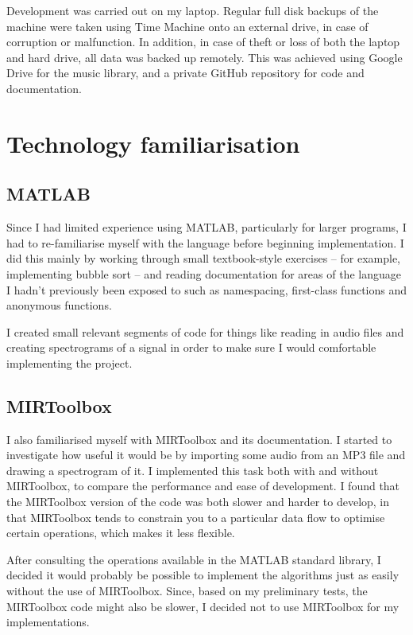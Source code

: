 \documentclass[12pt,a4paper,twoside,openright]{report}
\begin{document}
Development was carried out on my laptop. Regular full disk backups of the machine were taken using Time Machine onto an external drive, in case of corruption or malfunction. In addition, in case of theft or loss of both the laptop and hard drive, all data was backed up remotely. This was achieved using Google Drive for the music library, and a private GitHub repository for code and documentation.




\section{Technology familiarisation}

\subsection{MATLAB}

Since I had limited experience using MATLAB, particularly for larger programs, I had to re-familiarise myself with the language before beginning implementation. I did this mainly by working through small textbook-style exercises -- for example, implementing bubble sort -- and reading documentation for areas of the language I hadn't previously been exposed to such as namespacing, first-class functions and anonymous functions.

I created small relevant segments of code for things like reading in audio files and creating spectrograms of a signal in order to make sure I would comfortable implementing the project.

\subsection{MIRToolbox}

I also familiarised myself with MIRToolbox and its documentation. I started to investigate how useful it would be by importing some audio from an MP3 file and drawing a spectrogram of it. I implemented this task both with and without MIRToolbox, to compare the performance and ease of development. I found that the MIRToolbox version of the code was both slower and harder to develop, in that MIRToolbox tends to constrain you to a particular data flow to optimise certain operations, which makes it less flexible.

After consulting the operations available in the MATLAB standard library, I decided it would probably be possible to implement the algorithms just as easily without the use of MIRToolbox. Since, based on my preliminary tests, the MIRToolbox code might also be slower, I decided not to use MIRToolbox for my implementations.
\end{document}
